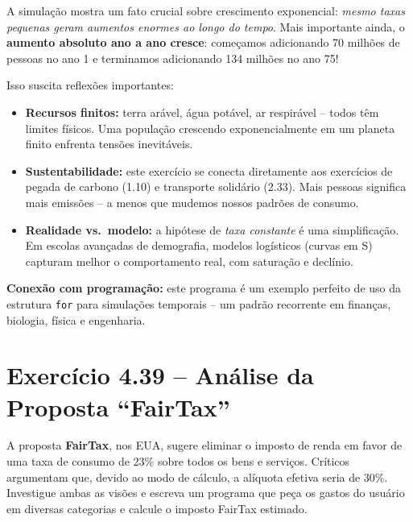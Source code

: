 \documentclass[12pt,a4paper]{article}
\begin{document}
\begin{tcolorbox}[colback=ecolightgreen,colframe=ecogreen,
  title={\bfseries Por que esse exercício importa?}]

A simulação mostra um fato crucial sobre crescimento exponencial: \textit{mesmo
taxas pequenas geram aumentos enormes ao longo do tempo}. Mais importante ainda,
o \textbf{aumento absoluto ano a ano cresce}: começamos adicionando 70 milhões
de pessoas no ano 1 e terminamos adicionando 134 milhões no ano 75!

Isso suscita reflexões importantes:
\begin{itemize}[noitemsep]
  \item \textbf{Recursos finitos:} terra arável, água potável, ar respirável -- todos
  têm limites físicos. Uma população crescendo exponencialmente em um planeta finito
  enfrenta tensões inevitáveis.
  \item \textbf{Sustentabilidade:} este exercício se conecta diretamente aos exercícios
  de pegada de carbono (1.10) e transporte solidário (2.33). Mais pessoas significa
  mais emissões -- a menos que mudemos nossos padrões de consumo.
  \item \textbf{Realidade vs.\ modelo:} a hipótese de \textit{taxa constante} é uma
  simplificação. Em escolas avançadas de demografia, modelos logísticos
  (curvas em S) capturam melhor o comportamento real, com saturação e declínio.
\end{itemize}

\textbf{Conexão com programação:} este programa é um exemplo perfeito de uso da
estrutura \texttt{for} para simulações temporais -- um padrão recorrente em finanças,
biologia, física e engenharia.
\end{tcolorbox}

\newpage

\section{Exercício 4.39 -- Análise da Proposta ``FairTax''}

\begin{enunciadoBox}[Enunciado 4.39]
A proposta \textbf{FairTax}, nos EUA, sugere eliminar o imposto de renda em favor
de uma taxa de consumo de 23\% sobre todos os bens e serviços. Críticos argumentam
que, devido ao modo de cálculo, a alíquota efetiva seria de 30\%. Investigue ambas as
visões e escreva um programa que peça os gastos do usuário em diversas categorias
e calcule o imposto FairTax estimado.
\end{enunciadoBox}
\end{document}
